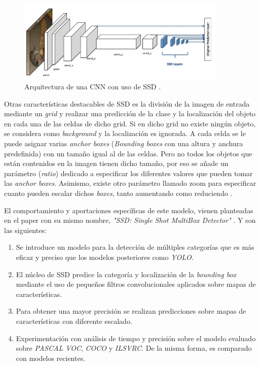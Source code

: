\begin{figure}[htp]
	\centering
	\includegraphics[width=10cm]{imagenes/cnnssd.png}
	\caption{Arquitectura de una CNN con uso de SSD \cite{ssdwork}.}
	\label{fig:ssd}
\end{figure}

Otras características destacables de SSD es la división de la imagen de entrada mediante un \textit{grid} y realizar una predicción de la clase y la localización del objeto en cada una de las celdas de dicho grid. Si en dicho grid no existe ningún objeto, se considera como \textit{background} y la localización es ignorada. A cada celda se le puede asignar varias \textit{anchor boxes} (\textit{Bounding boxes} con una altura y anchura predefinida) con un tamaño igual al de las celdas. Pero no todos los objetos que están contenidos en la imagen tienen dicho tamaño, por eso se añade un parámetro (\textit{ratio}) dedicado a especificar los diferentes valores que pueden tomar las \textit{anchor boxes}. Asimismo, existe otro parámetro llamado zoom para especificar cuanto pueden escalar dichos \textit{boxes}, tanto aumentando como reduciendo \cite{ssdwork}.

El comportamiento y aportaciones específicas de este modelo, vienen planteadas en el paper con su mismo nombre, \textit{"SSD: Single Shot MultiBox Detector"} \cite{ssd}. Y son las siguientes:

\begin{enumerate}
	\item Se introduce un modelo para la detección de múltiples categorías que es más eficaz y preciso que los modelos posteriores como \textit{YOLO}.
	\item El núcleo de SSD predice la categoría y localización de la \textit{bounding box} mediante el uso de pequeños filtros convolucionales aplicados sobre mapas de características.
	\item Para obtener una mayor precisión se realizan predicciones sobre mapas de características con diferente escalado.
	\item Experimentación con análisis de tiempo y precisión sobre el modelo evaluado sobre \textit{PASCAL VOC}, \textit{COCO} y \textit{ILSVRC}. De la misma forma, es comparado con modelos recientes.
\end{enumerate}

